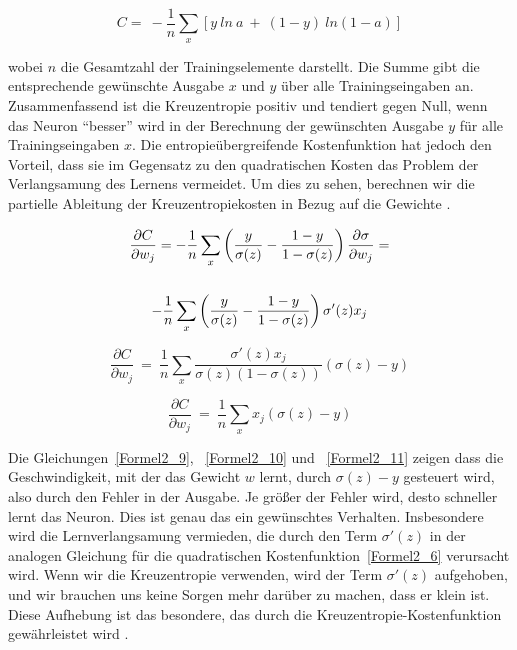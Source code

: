     \begin{equation} \label{Formel2_8}
        C=\ -\frac{1}{n}\sum _{x}[ y\ ln\ a\ +\ ( 1-y) \ ln( 1-a)]
    \end{equation}

    wobei $n$ die Gesamtzahl der Trainingselemente darstellt. Die Summe gibt die entsprechende gewünschte Ausgabe $x$ und $y$ über alle Trainingseingaben an. Zusammenfassend ist die Kreuzentropie positiv und tendiert gegen Null, wenn das Neuron
    \enquote{besser} wird in der Berechnung der gewünschten Ausgabe $y$ für alle Trainingseingaben $x$.  Die entropieübergreifende Kostenfunktion hat jedoch den Vorteil, dass sie im Gegensatz zu den quadratischen Kosten das Problem der Verlangsamung des Lernens vermeidet. Um dies zu sehen, berechnen wir die partielle Ableitung der Kreuzentropiekosten in Bezug auf die Gewichte \cite*[63]{Nielsen2015}.

    \begin{gather} \label{Formel2_9}
        \frac{\partial C}{\partial w_{j}} =-\frac{1}{n}\sum _{x}\left(\frac{y}{\sigma ( z)} -\frac{1-y}{1-\sigma ( z)}\right)\frac{\partial \sigma }{\partial w_{j}} = \notag\\
        \notag\\
        -\frac{1}{n}\sum _{x}\left(\frac{y}{\sigma ( z)} -\frac{1-y}{1-\sigma ( z)}\right) \sigma '( z) x_{j} \notag\\
    \end{gather}

    \begin{equation} \label{Formel2_10}
        \frac{\partial C}{\partial w_{j}} \ =\ \frac{1}{n}\sum _{x}\frac{\sigma '( z) x_{j}}{\sigma ( z)( 1-\sigma ( z))}( \sigma ( z) -y)
    \end{equation}

    \begin{equation} \label{Formel2_11}
        \frac{\partial C}{\partial w_{j}} \ =\ \frac{1}{n}\sum _{x} x_{j}( \sigma ( z) -y)
    \end{equation}


    Die Gleichungen~\ref{Formel2_9}, ~\ref{Formel2_10} und ~\ref{Formel2_11} zeigen dass die Geschwindigkeit, mit der das Gewicht $w$  lernt, durch $\sigma(z) - y$ gesteuert wird, also durch den Fehler in der Ausgabe. Je größer der Fehler wird, desto schneller lernt das Neuron. Dies ist genau das ein gewünschtes Verhalten. Insbesondere wird die Lernverlangsamung vermieden, die durch den Term $\sigma'(z)$ in der analogen Gleichung für die quadratischen Kostenfunktion~\ref{Formel2_6} verursacht wird. Wenn wir die Kreuzentropie verwenden, wird der Term $\sigma'(z)$ aufgehoben, und wir brauchen uns keine Sorgen mehr darüber zu machen, dass er klein ist. Diese Aufhebung ist das besondere, das durch die Kreuzentropie-Kostenfunktion gewährleistet wird \cite[63-64]{Nielsen2015}.

